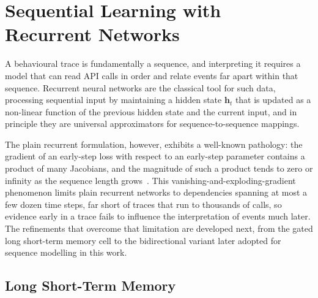 \documentclass[%
    BCOR=10mm,
    DIV=13,
    toc=bibliography,
    toc=listof,
    oneside,
    12pt,
]{scrbook}
\begin{document}
\section{Sequential Learning with Recurrent Networks}
\label{sec:lstm}

A behavioural trace is fundamentally a sequence, and interpreting it requires a
model that can read API calls in order and relate events far apart within that
sequence. Recurrent neural networks are the classical tool for such data,
processing sequential input by maintaining a hidden state $\mathbf{h}_t$ that is
updated as a non-linear function of the previous hidden state and the current
input, and in principle they are universal approximators for sequence-to-sequence
mappings.

The plain recurrent formulation, however, exhibits a well-known pathology: the
gradient of an early-step loss with respect to an early-step parameter contains
a product of many Jacobians, and the magnitude of such a product tends to zero
or infinity as the sequence length grows~\cite{bengio1994}. This
vanishing-and-exploding-gradient
phenomenon limits plain recurrent networks to dependencies spanning at most a
few dozen time steps, far short of traces that run to thousands of calls, so
evidence early in a trace fails to influence the interpretation of events much
later. The refinements that overcome that limitation are developed next, from
the gated long short-term memory cell to the bidirectional variant later adopted
for sequence modelling in this work.

\subsection{Long Short-Term Memory}
\label{subsec:lstm}
\end{document}
